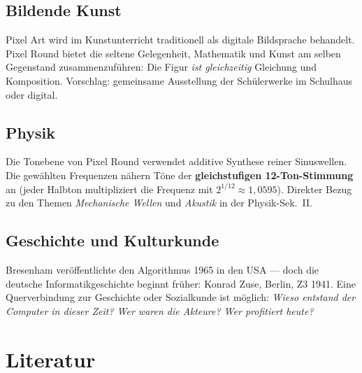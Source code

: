 \documentclass[12pt,a4paper]{scrartcl}
\newcommand{\acc}[1]{\textcolor{accent}{\textbf{#1}}}
\begin{document}
\subsection{Bildende Kunst}
Pixel Art wird im Kunstunterricht traditionell als digitale Bildsprache behandelt. Pixel Round bietet die seltene Gelegenheit, Mathematik und Kunst am selben Gegenstand zusammenzuführen: Die Figur \emph{ist gleichzeitig} Gleichung und Komposition. Vorschlag: gemeinsame Ausstellung der Schülerwerke im Schulhaus oder digital.

\subsection{Physik}
Die Tonebene von Pixel Round verwendet additive Synthese reiner Sinuswellen. Die gewählten Frequenzen nähern Töne der \acc{gleichstufigen 12-Ton-Stimmung} an (jeder Halbton multipliziert die Frequenz mit $2^{1/12} \approx 1{,}0595$). Direkter Bezug zu den Themen \emph{Mechanische Wellen} und \emph{Akustik} in der Physik-Sek.~II.

\subsection{Geschichte und Kulturkunde}
Bresenham veröffentlichte den Algorithmus 1965 in den USA --- doch die deutsche Informatikgeschichte beginnt früher: Konrad Zuse, Berlin, Z3 1941. Eine Querverbindung zur Geschichte oder Sozialkunde ist möglich: \emph{Wieso entstand der Computer in dieser Zeit? Wer waren die Akteure? Wer profitiert heute?}

\section{Literatur}
\end{document}
